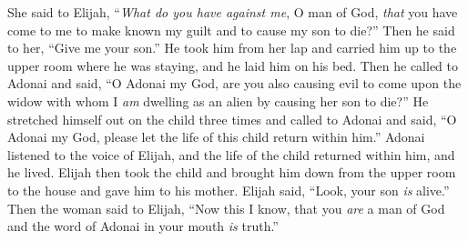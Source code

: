 \begin{biblechapter}
\verse She said to Elijah, “\textit{What do you have against me}, O man of God, \textit{that} you have come to me to make known my guilt and to cause my son to die?”
\verse Then he said to her, “Give me your son.” He took him from her lap and carried him up to the upper room where he was staying, and he laid him on his bed.
\verse Then he called to Adonai and said, “O Adonai my God, are you also causing evil to come upon the widow with whom I \textit{am} dwelling as an alien by causing her son to die?”
\verse He stretched himself out on the child three times and called to Adonai and said, “O Adonai my God, please let the life of this child return within him.”
\verse Adonai listened to the voice of Elijah, and the life of the child returned within him, and he lived.
\verse Elijah then took the child and brought him down from the upper room to the house and gave him to his mother. Elijah said, “Look, your son \textit{is} alive.”
\verse Then the woman said to Elijah, “Now this I know, that you \textit{are} a man of God and the word of Adonai in your mouth \textit{is} truth.”
\end{biblechapter}

